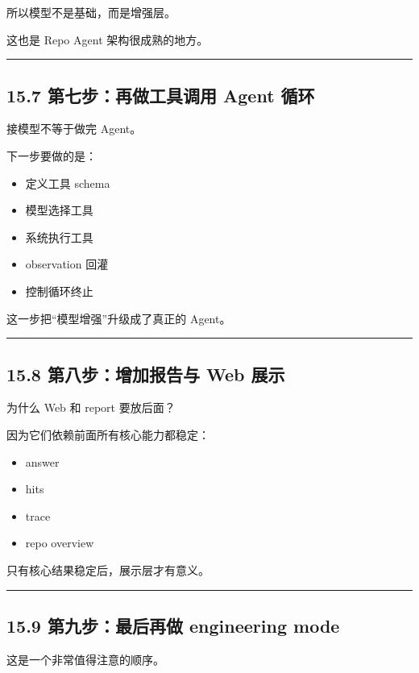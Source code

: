 \documentclass[UTF8,12pt,openany]{ctexbook}
\begin{document}
所以模型不是基础，而是增强层。  \par
这也是 Repo Agent 架构很成熟的地方。\par

\hrule

\subsection{15.7 第七步：再做工具调用 Agent 循环}

接模型不等于做完 Agent。  \par
下一步要做的是：\par

\begin{itemize}
\item 定义工具 schema
\item 模型选择工具
\item 系统执行工具
\item observation 回灌
\item 控制循环终止
\end{itemize}

这一步把“模型增强”升级成了真正的 Agent。\par

\hrule

\subsection{15.8 第八步：增加报告与 Web 展示}

为什么 Web 和 report 要放后面？\par

因为它们依赖前面所有核心能力都稳定：\par

\begin{itemize}
\item answer
\item hits
\item trace
\item repo overview
\end{itemize}

只有核心结果稳定后，展示层才有意义。\par

\hrule

\subsection{15.9 第九步：最后再做 engineering mode}

这是一个非常值得注意的顺序。\par
\end{document}
